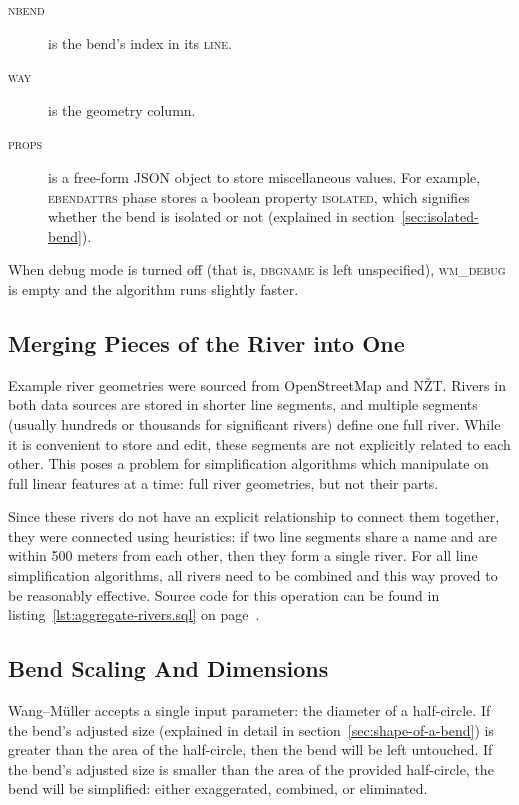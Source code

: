 \documentclass[a4paper]{article}
\newcommand{\onpage}[1]{\ref{#1} on page~\pageref{#1}}
\newcommand{\WM}{Wang--M{\"u}ller}
\begin{document}
\begin{description}
    \item[\normalfont\textsc{nbend}] is the bend's index in its \textsc{line}.

    \item[\normalfont\textsc{way}] is the geometry column.

    \item[\normalfont\textsc{props}] is a free-form JSON object to store
        miscellaneous values. For example, \textsc{ebendattrs} phase stores a
        boolean property \textsc{isolated}, which signifies whether the bend is
        isolated or not (explained in section~\ref{sec:isolated-bend}).

\end{description}

When debug mode is turned off (that is, \textsc{dbgname} is left unspecified),
\textsc{wm\_debug} is empty and the algorithm runs slightly faster.

\subsection{Merging Pieces of the River into One}

Example river geometries were sourced from OpenStreetMap\cite{openstreetmap}
and NŽT\cite{nzt}. Rivers in both data sources are stored in shorter line
segments, and multiple segments (usually hundreds or thousands for significant
rivers) define one full river. While it is convenient to store and edit, these
segments are not explicitly related to each other. This poses a problem for
simplification algorithms which manipulate on full linear features at a time:
full river geometries, but not their parts.

Since these rivers do not have an explicit relationship to connect them
together, they were connected using heuristics: if two line segments share a
name and are within 500 meters from each other, then they form a single river.
For all line simplification algorithms, all rivers need to be combined and
this way proved to be reasonably effective. Source code for this operation can
be found in listing~\onpage{lst:aggregate-rivers.sql}.

\subsection{Bend Scaling And Dimensions}
\label{sec:bend-scaling-and-dimensions}

{\WM} accepts a single input parameter: the diameter of a half-circle. If the
bend's adjusted size (explained in detail in section~\ref{sec:shape-of-a-bend})
is greater than the area of the half-circle, then the bend will be left
untouched. If the bend's adjusted size is smaller than the area of the provided
half-circle, the bend will be simplified: either exaggerated, combined, or
eliminated.
\end{document}
